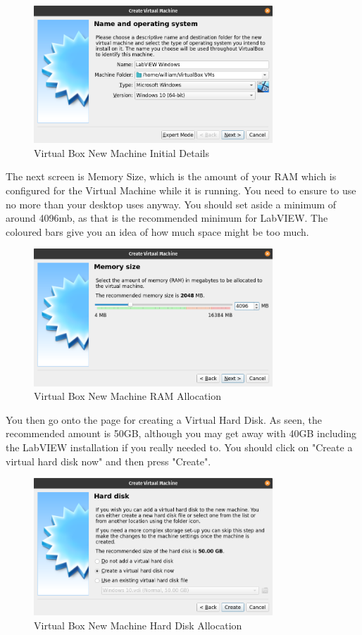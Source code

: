 \documentclass[a4paper,11pt]{report}
\begin{document}
\begin{figure}[H]
\centering
\includegraphics[width=0.8\textwidth]{screenshots/virtualboxsetupfilled}
\caption{Virtual Box New Machine Initial Details}
\end{figure}

The next screen is Memory Size, which is the amount of your RAM which is configured for the Virtual Machine while it is running. You need to ensure to use no more than your desktop uses anyway. You should set aside a minimum of around 4096mb, as that is the recommended minimum for LabVIEW. The coloured bars give you an idea of how much space might be too much.

\begin{figure}[H]
\centering
\includegraphics[width=0.8\textwidth]{screenshots/virtualboxram}
\caption{Virtual Box New Machine RAM Allocation}
\end{figure}

You then go onto the page for creating a Virtual Hard Disk. As seen, the recommended amount is 50GB, although you may get away with 40GB including the LabVIEW installation if you really needed to. You should click on "Create a virtual hard disk now" and then press "Create".

\begin{figure}[H]
\centering
\includegraphics[width=0.8\textwidth]{screenshots/virtualboxharddisk}
\caption{Virtual Box New Machine Hard Disk Allocation}
\end{figure}
\end{document}

